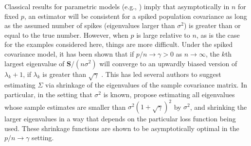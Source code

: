 \documentclass[12pt]{article}
\newcommand{\bl}[1]{{\mathbf #1}}
\begin{document}
Classical results for parametric models (e.g., \citet{Schwartz1965})
imply that asymptotically in $n$ for fixed $p$, an estimator will
be consistent for a spiked population covariance as long as the
assumed number of spikes (eigenvalues larger than $\sigma^2$) is greater than or
equal to the true number.  However, when $p$ is large relative to $n$,
as is the case for the examples considered here, things are more
difficult.  Under the spiked covariance model, it has been shown that
if $p/n \rightarrow \gamma >0$ as $n\rightarrow \infty$, the $k$th largest
eigenvalue of $\bl S/(n\sigma^2)$ will converge to an upwardly biased
version of $\lambda_{k}+1$, if $\lambda_k$
is greater than $\sqrt{\gamma}$ \citep{Baik2006, Paul2007} .  This has
led several authors to suggest estimating $\Sigma$ via shrinkage of
the eigenvalues of the sample covariance matrix. In particular, in the
setting that $\sigma^2$ is known, \citet{Donoho2013} propose estimating
all eigenvalues whose sample estimates are smaller than 
$\sigma^2(1+\sqrt{\gamma})^2$ by $\sigma^2$, and shrinking the
larger eigenvalues in a way that depends on the particular loss
function being used.  These shrinkage functions are shown to be
asymptotically optimal in the $p/n\rightarrow \gamma$ setting.






\end{document}

